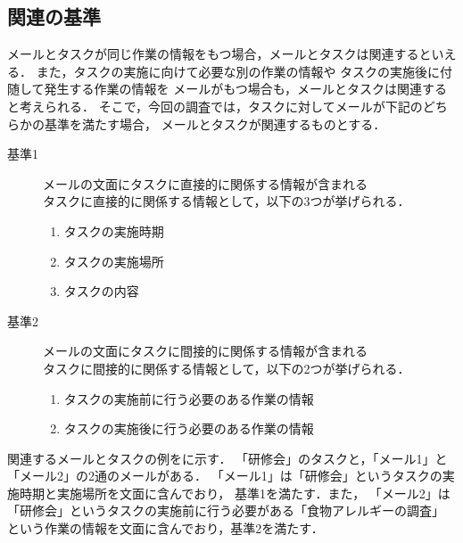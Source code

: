 \documentclass[submit,techreq,noauthor,dvipdfmx]{ipsj}
\begin{document}
\subsection{関連の基準}\label{sec:reference_point}

メールとタスクが同じ作業の情報をもつ場合，メールとタスクは関連するといえる．
また，タスクの実施に向けて必要な別の作業の情報や
タスクの実施後に付随して発生する作業の情報を
メールがもつ場合も，メールとタスクは関連すると考えられる．
そこで，今回の調査では，タスクに対してメールが下記のどちらかの基準を満たす場合，
メールとタスクが関連するものとする．
\begin{description}

\item[基準1] メールの文面にタスクに直接的に関係する情報が含まれる\\
タスクに直接的に関係する情報として，以下の3つが挙げられる．
\begin{enumerate}

\item タスクの実施時期

\item タスクの実施場所

\item タスクの内容

\end{enumerate}


\item[基準2] メールの文面にタスクに間接的に関係する情報が含まれる\\
タスクに間接的に関係する情報として，以下の2つが挙げられる．
\begin{enumerate}

\item タスクの実施前に行う必要のある作業の情報

\item タスクの実施後に行う必要のある作業の情報

\end{enumerate}

\end{description}

関連するメールとタスクの例をに示す．
「研修会」のタスクと，「メール1」と「メール2」の2通のメールがある．
「メール1」は「研修会」というタスクの実施時期と実施場所を文面に含んでおり，
基準1を満たす．また，
「メール2」は「研修会」というタスクの実施前に行う必要がある「食物アレルギーの調査」
という作業の情報を文面に含んでおり，基準2を満たす．
\end{document}
